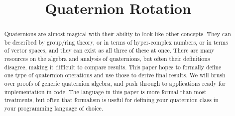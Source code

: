 \documentclass{amsart}
\theoremstyle{definition}
\theoremstyle{remark}
\numberwithin{equation}{section}
\begin{document}
\title{Quaternion Rotation}

\begin{abstract}
Quaternions are almost magical with their ability to look like other concepts. They can be described by group/ring theory, or in terms of hyper-complex numbers, or in terms of vector spaces, and they can exist as all three of these at once. There are many resources on the algebra and analysis of quaternions, but often their definitions disagree, making it difficult to compare results. This paper hopes to formally define one type of quaternion operations and use those to derive final results. We will brush over proofs of generic quaternion algebra, and push through to applications ready for implementation in code. The language in this paper is more formal than most treatments, but often that formalism is useful for defining your quaternion class in your programming language of choice.
\end{abstract}

\maketitle
\end{document}

